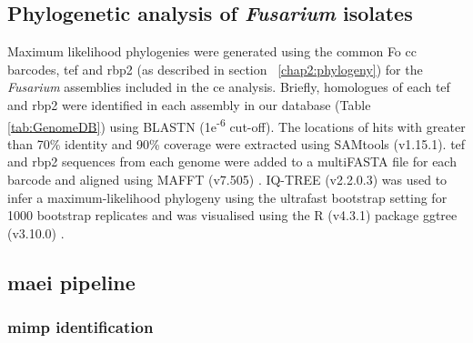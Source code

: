 \bigskip

\bigskip

\newpage

\subsection{Phylogenetic analysis of \textit{Fusarium} isolates}

Maximum likelihood phylogenies were generated using the common \ac{Fo} \ac{cc} barcodes, \Ac{tef} and \ac{rbp2} (as described in section ~\ref{chap2:phylogeny}) for the \textit{Fusarium} assemblies included in the \ac{ce} analysis. Briefly, homologues of each \ac{tef} and \ac{rbp2} were identified in each assembly in our database  (Table \ref{tab:GenomeDB}) using BLASTN (1e\textsuperscript{-6} cut-off). The locations of hits with greater than 70\% identity and 90\% coverage were extracted using SAMtools (v1.15.1). \Ac{tef} and \ac{rbp2} sequences from each genome were added to a  multiFASTA file for each barcode and aligned using MAFFT (v7.505) \parencite{Katoh2019}. IQ-TREE (v2.2.0.3) \parencite{Nguyen2015} was used to infer a maximum-likelihood phylogeny using the ultrafast bootstrap setting for 1000 bootstrap replicates and was visualised using the R \parencite{R} (v4.3.1) package ggtree (v3.10.0) \parencite{ggtree}.

\subsection{\acf{maei} pipeline}

\subsubsection{\Ac{mimp} identification}

